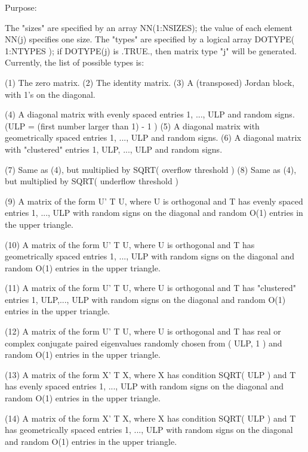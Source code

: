 \begin{DoxyParagraph}{Purpose\+: }
\begin{DoxyVerb}
    The "sizes" are specified by an array NN(1:NSIZES); the value of
    each element NN(j) specifies one size.
    The "types" are specified by a logical array DOTYPE( 1:NTYPES );
    if DOTYPE(j) is .TRUE., then matrix type "j" will be generated.
    Currently, the list of possible types is:

    (1)  The zero matrix.
    (2)  The identity matrix.
    (3)  A (transposed) Jordan block, with 1's on the diagonal.

    (4)  A diagonal matrix with evenly spaced entries
         1, ..., ULP  and random signs.
         (ULP = (first number larger than 1) - 1 )
    (5)  A diagonal matrix with geometrically spaced entries
         1, ..., ULP  and random signs.
    (6)  A diagonal matrix with "clustered" entries 1, ULP, ..., ULP
         and random signs.

    (7)  Same as (4), but multiplied by SQRT( overflow threshold )
    (8)  Same as (4), but multiplied by SQRT( underflow threshold )

    (9)  A matrix of the form  U' T U, where U is orthogonal and
         T has evenly spaced entries 1, ..., ULP with random signs
         on the diagonal and random O(1) entries in the upper
         triangle.

    (10) A matrix of the form  U' T U, where U is orthogonal and
         T has geometrically spaced entries 1, ..., ULP with random
         signs on the diagonal and random O(1) entries in the upper
         triangle.

    (11) A matrix of the form  U' T U, where U is orthogonal and
         T has "clustered" entries 1, ULP,..., ULP with random
         signs on the diagonal and random O(1) entries in the upper
         triangle.

    (12) A matrix of the form  U' T U, where U is orthogonal and
         T has real or complex conjugate paired eigenvalues randomly
         chosen from ( ULP, 1 ) and random O(1) entries in the upper
         triangle.

    (13) A matrix of the form  X' T X, where X has condition
         SQRT( ULP ) and T has evenly spaced entries 1, ..., ULP
         with random signs on the diagonal and random O(1) entries
         in the upper triangle.

    (14) A matrix of the form  X' T X, where X has condition
         SQRT( ULP ) and T has geometrically spaced entries
         1, ..., ULP with random signs on the diagonal and random
         O(1) entries in the upper triangle.


\end{DoxyVerb}
\end{DoxyParagraph}
